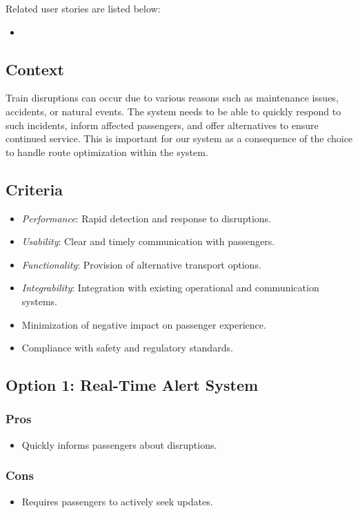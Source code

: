 Related user stories are listed below:
\begin{itemize}[noitemsep]
    \item \userStoryTwentySix
\end{itemize}

\subsection*{Context}
Train disruptions can occur due to various reasons such as maintenance issues, accidents, or natural events. The system needs to be able to quickly respond to such incidents, inform affected passengers, and offer alternatives to ensure continued service.
This is important for our system as a consequence of the choice to handle route optimization within the system.

\subsection*{Criteria}
\begin{itemize}[noitemsep]
    \item \textit{Performance}: Rapid detection and response to disruptions.
    \item \textit{Usability}: Clear and timely communication with passengers.
    \item \textit{Functionality}: Provision of alternative transport options.
    \item \textit{Integrability}: Integration with existing operational and communication systems.
    \item Minimization of negative impact on passenger experience.
    \item Compliance with safety and regulatory standards.
\end{itemize}


\subsection*{Option 1: Real-Time Alert System}
\subsubsection*{Pros}
\begin{itemize}
    \item Quickly informs passengers about disruptions.
\end{itemize}
\subsubsection*{Cons}
\begin{itemize}
    \item Requires passengers to actively seek updates.
\end{itemize}

